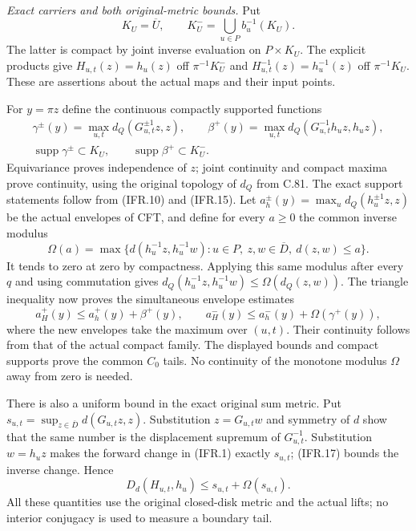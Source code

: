 \documentclass[11pt,a4paper]{article}
\begin{document}
\emph{Exact carriers and both original-metric bounds.}
Put
\[
 K_U=\overline U,\qquad
 K_U^- =\bigcup_{u\in P}b_u^{-1}(K_U).
                                                               \tag{IFR.15}
\]
The latter is compact by joint inverse evaluation on $P\times K_U$.
The explicit products give
$H_{u,t}(z)=h_u(z)$ off $\pi^{-1}K_U^-$ and
$H_{u,t}^{-1}(z)=h_u^{-1}(z)$ off $\pi^{-1}K_U$.
These are assertions about the actual maps and their input points.

For $y=\pi z$ define the continuous compactly supported functions
\[
\begin{gathered}
 \gamma^\pm(y)=\max_{u,t}d_Q(G_{u,t}^{\pm1}z,z),\qquad
 \beta^+(y)=\max_{u,t}d_Q(G_{u,t}^{-1}h_u z,h_u z),\\
 \operatorname{supp}\gamma^\pm\subset K_U,\qquad
 \operatorname{supp}\beta^+\subset K_U^-.
\end{gathered}                                                    \tag{IFR.16}
\]
Equivariance proves independence of $z$; joint continuity and compact
maxima prove continuity, using the original topology of $d_Q$ from C.81.
The exact support statements follow from (IFR.10) and (IFR.15).
Let $a_h^\pm(y)=\max_u d_Q(h_u^{\pm1}z,z)$ be the actual envelopes
of CFT, and define for every $a\geq0$ the common inverse modulus
\[
 \Omega(a)=\max\{d(h_u^{-1}z,h_u^{-1}w):u\in P,
                \ z,w\in\overline D,\ d(z,w)\leq a\}.
                                                               \tag{IFR.17}
\]
It tends to zero at zero by compactness. Applying this same modulus
after every $q$ and using commutation gives
$d_Q(h_u^{-1}z,h_u^{-1}w)\leq\Omega(d_Q(z,w))$.
The triangle inequality now proves the simultaneous envelope estimates
\[
 a_H^+(y)\leq a_h^+(y)+\beta^+(y),\qquad
 a_H^-(y)\leq a_h^-(y)+\Omega(\gamma^+(y)),
                                                               \tag{IFR.18}
\]
where the new envelopes take the maximum over $(u,t)$.
Their continuity follows from that of the actual compact family.
The displayed bounds and compact supports prove the common $C_0$ tails.
No continuity of the monotone modulus $\Omega$ away from zero is needed.

There is also a uniform bound in the exact original sum metric.
Put $s_{u,t}=\sup_{z\in\overline D}d(G_{u,t}z,z)$.
Substitution $z=G_{u,t}w$ and symmetry of $d$ show that the same
number is the displacement supremum of $G_{u,t}^{-1}$.
Substitution $w=h_u z$ makes the forward change in (IFR.1) exactly
$s_{u,t}$; (IFR.17) bounds the inverse change. Hence
\[
 D_d(H_{u,t},h_u)\leq s_{u,t}+\Omega(s_{u,t}).                    \tag{IFR.19}
\]
All these quantities use the original closed-disk metric and the
actual lifts; no interior conjugacy is used to measure a boundary tail.
\end{document}
